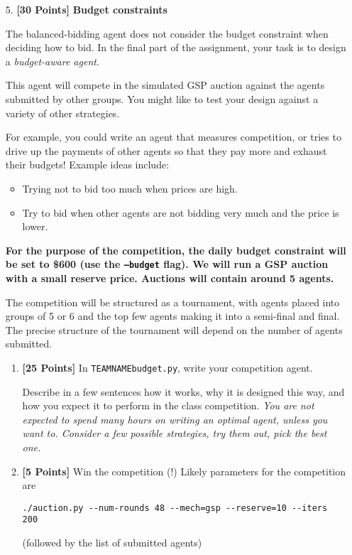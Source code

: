 \documentclass[11pt]{article}
\newcommand{\points}[1]{\textbf{[#1 Points]}}
\begin{document}
\begin{enumerate}
		\item[5.] \points{30} {\bf Budget constraints} 

                  The balanced-bidding agent does not consider the
                  budget constraint when deciding how to bid.  In the
                  final part of the assignment, your task is to design
                  a {\em budget-aware agent}.

                  This agent will compete in the simulated GSP auction
                  against the agents submitted by other groups. You
                  might like to test your design against a variety of
                  other strategies.

                  For example, you could write an agent that measures
                  competition, or 
tries to drive up the payments of other
                  agents so that they pay more and exhaust their
budgets! Example ideas include:
%
\begin{itemize}
\item Trying not to bid too much when 
prices are high.
%
\item Try to bid when other agents are not bidding very much
and the price is lower. 
%
\end{itemize}

{\bf For the purpose of the competition, the daily budget constraint
  will be set to \$600 (use the \texttt{--budget} flag). We will run a
  GSP auction with a small reserve price.  Auctions will contain
  around 5 agents.}

The competition will be structured as a tournament, with agents placed
into groups of 5 or 6 and the top few agents making it into a
semi-final and final. The precise structure of the tournament will
depend on the number of agents submitted.

		\begin{enumerate}
			\item \points{25} In \verb+TEAMNAMEbudget.py+, write your  competition agent. 

Describe in a few sentences how it works, why 
it is designed this way, 
and how you expect it to perform in the class competition.
		 {\em You are not expected to spend many hours on writing an optimal  agent, unless you want to. Consider a few possible strategies, try them out, pick the best one.}

			\item \points{5} Win the competition (!)
		Likely parameters for the competition are
		
		\verb+./auction.py --num-rounds 48 --mech=gsp --reserve=10 --iters 200+

(followed by the list of submitted agents)

		\end{enumerate}			
	\end{enumerate}
\end{document}
